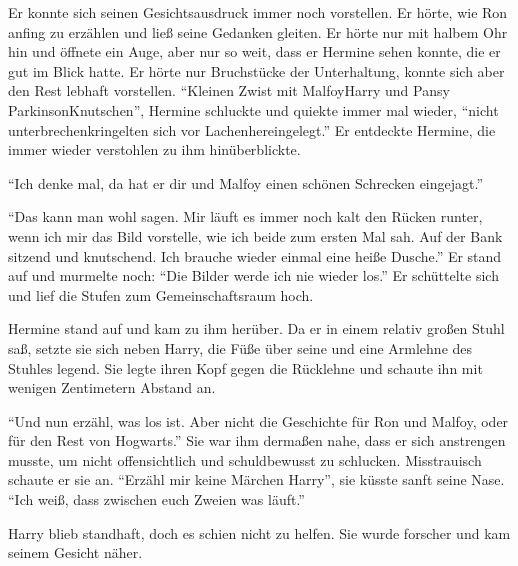 Er konnte sich seinen Gesichtsausdruck immer noch vorstellen. Er hörte, wie Ron anfing zu erzählen und ließ seine Gedanken gleiten. Er hörte nur mit halbem Ohr hin und öffnete ein Auge, aber nur so weit, dass er Hermine sehen konnte, die er gut im Blick hatte. Er hörte nur Bruchstücke der Unterhaltung, konnte sich aber den Rest lebhaft vorstellen. \enquote{Kleinen Zwist mit Malfoy\abs Harry und Pansy Parkinson\abs Knutschen\abs}, Hermine schluckte und quiekte immer mal wieder, \enquote{nicht unterbrechen\abs kringelten sich vor Lachen\abs hereingelegt.} Er entdeckte Hermine, die immer wieder verstohlen zu ihm hinüberblickte.

\enquote{Ich denke mal, da hat er dir und Malfoy einen schönen Schrecken eingejagt.}

\enquote{Das kann man wohl sagen. Mir läuft es immer noch kalt den Rücken runter, wenn ich mir das Bild vorstelle, wie ich beide zum ersten Mal sah. Auf der Bank sitzend und knutschend. Ich brauche wieder einmal eine heiße Dusche.} Er stand auf und murmelte noch: \enquote{Die Bilder werde ich nie wieder los.} Er schüttelte sich und lief die Stufen zum Gemeinschaftsraum hoch.

Hermine stand auf und kam zu ihm herüber. Da er in einem relativ großen Stuhl saß, setzte sie sich neben Harry, die Füße über seine und eine Armlehne des Stuhles legend. Sie legte ihren Kopf gegen die Rücklehne und schaute ihn mit wenigen Zentimetern Abstand an.

\enquote{Und nun erzähl, was los ist. Aber nicht die Geschichte für Ron und Malfoy, oder für den Rest von Hogwarts.} Sie war ihm dermaßen nahe, dass er sich anstrengen musste, um nicht offensichtlich und schuldbewusst zu schlucken. Misstrauisch schaute er sie an. \enquote{Erzähl mir keine Märchen Harry\abs}, sie küsste sanft seine Nase. \enquote{Ich weiß, dass zwischen euch Zweien was läuft.}

Harry blieb standhaft, doch es schien nicht zu helfen. Sie wurde forscher und kam seinem Gesicht näher.

